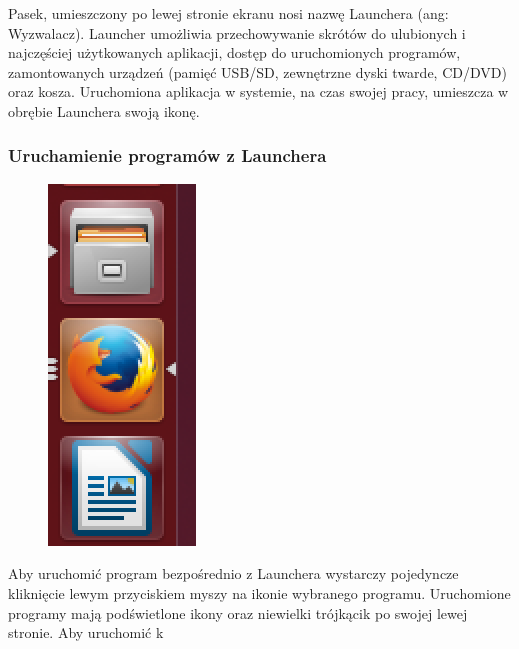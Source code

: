 Pasek, umieszczony po lewej stronie ekranu nosi nazwę Launchera (ang: \textcolor{ubuntu_orange}{Wyzwalacz}). Launcher umożliwia przechowywanie skrótów do ulubionych i najczęściej użytkowanych aplikacji, dostęp do uruchomionych programów, zamontowanych urządzeń (pamięć USB/SD, zewnętrzne dyski twarde, CD/DVD) oraz kosza. Uruchomiona aplikacja w systemie, na czas swojej pracy, umieszcza w obrębie Launchera swoją ikonę.

\subsubsection{Uruchamienie programów z Launchera}
\begin{figure}
	\vspace{-10pt}
\includegraphics[width=\linewidth]{images/unity_launcher_programy.png}
\end{figure}

Aby uruchomić program bezpośrednio z Launchera wystarczy pojedyncze kliknięcie lewym przyciskiem myszy na ikonie wybranego programu. Uruchomione programy mają podświetlone ikony oraz niewielki trójkącik po swojej lewej stronie. Aby uruchomić k
